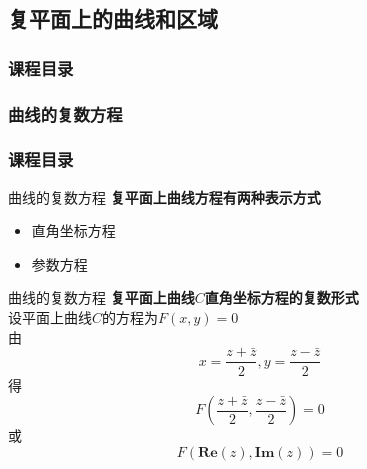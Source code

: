 \documentclass{beamer}
\begin{document}
\subsection{复平面上的曲线和区域}
\begin{frame}[t]
\frametitle{课程目录}
\tableofcontents[currentsubsection ] %
\end{frame}

\subsubsection{曲线的复数方程}
\begin{frame}[t]
\frametitle{课程目录}
\tableofcontents[currentsubsection ] %
\end{frame}

\begin{frame}{曲线的复数方程}
\textbf{复平面上曲线方程有两种表示方式}
\begin{itemize}
    \item 直角坐标方程
    \item 参数方程
\end{itemize}

\end{frame}

\begin{frame}{曲线的复数方程}
\textbf{复平面上曲线$C$直角坐标方程的复数形式}\\
设平面上曲线$C$的方程为$F(x,y) = 0$\\
由
$$x = \frac{z + \bar{z}}{2}, y= \frac{z - \bar{z}}{2}$$
得
$$F\left( \frac{z + \bar{z}}{2},  \frac{z - \bar{z}}{2} \right) = 0$$
或
$$F\left( \mathbf{Re}(z), \mathbf{Im}(z) \right )= 0$$


\end{frame}
\end{document}
